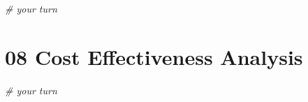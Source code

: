 \documentclass[
]{article}
\newenvironment{Shaded}{\begin{snugshade}}{\end{snugshade}}
\newcommand{\CommentTok}[1]{\textcolor[rgb]{0.56,0.35,0.01}{\textit{#1}}}
\begin{document}
\begin{Shaded}
\begin{Highlighting}[]
\CommentTok{# your turn}
\end{Highlighting}
\end{Shaded}

\hypertarget{cost-effectiveness-analysis}{%
\section{08 Cost Effectiveness
Analysis}\label{cost-effectiveness-analysis}}

\begin{Shaded}
\begin{Highlighting}[]
\CommentTok{# your turn}
\end{Highlighting}
\end{Shaded}
\end{document}

